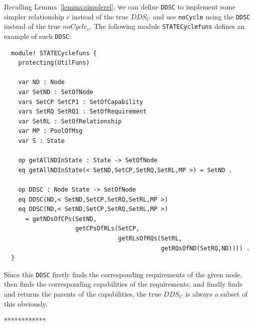 \documentclass[12pt]{report}
\begin{document}
Recalling Lemma~\ref{lemma:simplerel}, we can define {\tt DDSC} to
implement some simpler relationship $r$ instead of the true $DDS_C$
and use {\tt noCycle} using the {\tt DDSC} instead of the true
$noCycle_c$. The following module {\tt STATECyclefuns} defines an
example of such {\tt DDSC}:
\small
\begin{verbatim}
  module! STATECyclefuns {
    protecting(UtilFuns)
  
    var ND : Node
    var SetND : SetOfNode
    vars SetCP SetCP1 : SetOfCapability
    vars SetRQ SetRQ1 : SetOfRequirement
    var SetRL : SetOfRelationship
    var MP : PoolOfMsg
    var S : State
  
    op getAllNDInState : State -> SetOfNode
    eq getAllNDInState(< SetND,SetCP,SetRQ,SetRL,MP >) = SetND .
  
    op DDSC : Node State -> SetOfNode
    eq DDSC(ND,< SetND,SetCP,SetRQ,SetRL,MP >)
    eq DDSC(ND,< SetND,SetCP,SetRQ,SetRL,MP >)
      = getNDsOfCPs(SetND,
                    getCPsOfRLs(SetCP,
                                getRLsOfRQs(SetRL,
                                            getRQsOfND(SetRQ,ND)))) .
  }
\end{verbatim}
\normalsize
Since this {\tt DDSC} firstly finds the corresponding requirements of
the given node, then finds the corresponding capabilities of the
requirements, and finally finds and returns the parents of the
capabilities, the true $DDS_C$ is always a subset of this obviously.

************
\end{document}
